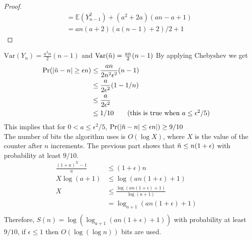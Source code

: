 \documentclass[11pt]{article}
\begin{document}
\begin{solution}
\begin{proof}
\begin{align*}
&= \mathbb{E}(Y_{n-1}^2) + (a^2 + 2a)(an - a + 1) \\
&=  an(a + 2)(a(n-1) + 2)/2 + 1  \tag{By induction}
\end{align*}
\end{proof}
$\mathrm{Var}(Y_n) = \frac{a^3n}{2}(n-1)$ and $\mathrm{Var}(\Tilde{n}) =  \frac{an}{2}(n-1)$
By applying Chebyshev we get \\
\begin{align*}
    \Pr(|\Tilde{n} - n| \geq \epsilon n) &\leq \frac{an}{2n^2\epsilon^2}(n-1) \\
    &\leq \frac{a}{2\epsilon^2}(1 - 1/n) \\
    &\leq \frac{a}{2\epsilon^2} \\
    &\leq 1/10 \tag{this is true when $a \leq \epsilon^2/5$}
\end{align*}
This implies that for $0 < a \leq \epsilon^2/5$, $\Pr(|\Tilde{n} - n| \leq \epsilon n|) \geq 9/10$ \\
The number of bits the algorithm uses is $O(\log X)$, where $X$ is the value of the counter after $n$ increments. The previous part shows that $\Tilde{n} \leq n (1+ \epsilon)$ with probability at least $9/10$. \\
\begin{align*}
    \frac{(1+a)^X - 1}{a} &\leq (1+\epsilon)n \\
    X \log(a+1) &\leq \log(an (1+\epsilon) + 1) \\ 
    X &\leq \frac{\log (an (1+\epsilon) + 1)}{\log (a+1)} \\
    &= \log_{a+1}(an (1+\epsilon) + 1) \\
\end{align*}
Therefore, $S(n) = \log(\log_{a+1}(an (1+\epsilon) + 1))$ with probability at least $9/10$, if $\epsilon \leq 1$ then $O(\log ( \log n))$ bits are used. 











\end{solution}
\end{document}
